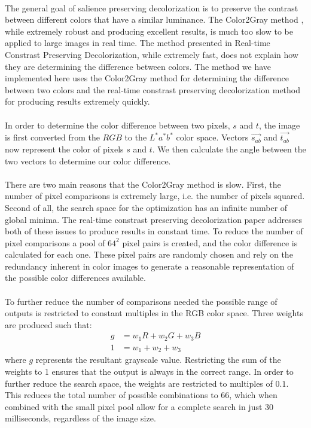 \documentclass[10pt,twocolumn]{article}
\begin{document}
	\paragraph{} The general goal of salience preserving decolorization is to preserve the contrast between different colors that have a similar luminance.  The Color2Gray method \cite{Gooch05color2gray:salience-preserving}, while extremely robust and producing excellent results, is much too slow to be applied to large images in real time.  The method presented in Real-time Constrast Preserving Decolorization\cite{lu:real-time}, while extremely fast, does not explain how they are determining the difference between colors.  The method we have implemented here uses the Color2Gray method for determining the difference between two colors and the real-time constrast preserving decolorization method for producing results extremely quickly.
	\paragraph{} In order to determine the color difference between two pixels, $s$ and $t$, the image is first converted from the $RGB$ to the $L^*a^*b^*$ color space.  Vectors $\vec{s_{ab}}$ and $\vec{t_{ab}}$ now represent the color of pixels $s$ and $t$.  We then calculate the angle between the two vectors to determine our color difference.\cite{Gooch05color2gray:salience-preserving}
	\paragraph{} There are two main reasons that the Color2Gray method is slow.  First, the number of pixel comparisons is extremely large, i.e. the number of pixels squared.  Second of all, the search space for the optimization has an infinite number of global minima\cite{Gooch05color2gray:salience-preserving}.  The real-time constrast preserving decolorization paper\cite{lu:real-time} addresses both of these issues to produce results in constant time.  To reduce the number of pixel comparisons a pool of $64^2$ pixel pairs is created, and the color difference is calculated for each one.  These pixel pairs are randomly chosen and rely on the redundancy inherent in color images to generate a reasonable representation of the possible color differences available.
	\paragraph{} To further reduce the number of comparisons needed the possible range of outputs is restricted to constant multiples in the RGB color space.  Three weights are produced such that:
\begin{align}
g &= w_1R + w_2G + w_3B \\
1 &= w_1 + w_2 + w_3
\end{align}
where $g$ represents the resultant grayscale value.  Restricting the sum of the weights to 1 ensures that the output is always in the correct range.  In order to further reduce the search space, the weights are restricted to multiples of $0.1$.  This reduces the total number of possible combinations to 66, which when combined with the small pixel pool allow for a complete search in just 30 milliseconds, regardless of the image size.
\end{document}
